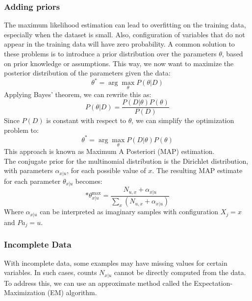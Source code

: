 \subsubsection{Adding priors}
The maximum likelihood estimation can lead to overfitting on the training data, especially when the dataset is small.
Also, configuration of variables that do not appear in the training data will have zero probability.
A common solution to these problems is to introduce a prior distribution over the parameters $\theta$,
based on prior knowledge or assumptions.
This way, we now want to maximize the posterior distribution of the parameters given the data:
\begin{equation*}
    \theta^* = \arg\max_{\theta} P(\theta | D)
\end{equation*}
Applying Bayes' theorem, we can rewrite this as:
\begin{equation*}
    P(\theta | D) =\frac{P(D | \theta) P(\theta)}{P(D)}
\end{equation*}
Since $P(D)$ is constant with respect to $\theta$, we can simplify the optimization problem to:
\begin{equation}
    \theta^* = \arg\max_{\theta} P(D | \theta) P(\theta)
\end{equation}
This approach is known as Maximum A Posteriori (MAP) estimation.
\\The conjugate prior for the multinomial distribution is the Dirichlet distribution, 
with parameters $\alpha_{x|u}$, for each possible value of $x$.
The resulting MAP estimate for each parameter $\theta_{x|u}$ becomes:
\begin{equation}*
    \theta_{x|u}^{\max} = \frac{N_{u,x} + \alpha_{x|u}}{\sum_{x} (N_{u,x} + \alpha_{x|u})}
\end{equation}
Where $\alpha_{x|u}$ can be interpreted as imaginary samples with configuration $X_j = x$ and $Pa_j = u$.

\subsubsection{Incomplete Data}
With incomplete data, some examples may have missing values for certain variables.
In such cases, counts $N_{x|u}$ cannot be directly computed from the data.
To address this, we can use an approximate method called the Expectation-Maximization (EM) algorithm.
